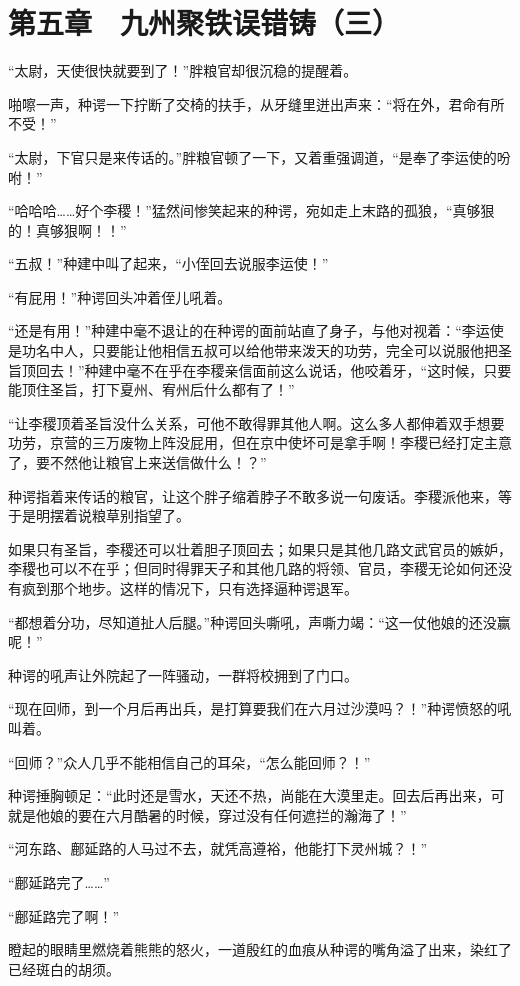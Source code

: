 \section{第五章　九州聚铁误错铸（三）}

“太尉，天使很快就要到了！”胖粮官却很沉稳的提醒着。

啪嚓一声，种谔一下拧断了交椅的扶手，从牙缝里迸出声来：“将在外，君命有所不受！”

“太尉，下官只是来传话的。”胖粮官顿了一下，又着重强调道，“是奉了李运使的吩咐！”

“哈哈哈……好个李稷！”猛然间惨笑起来的种谔，宛如走上末路的孤狼，“真够狠的！真够狠啊！！”

“五叔！”种建中叫了起来，“小侄回去说服李运使！”

“有屁用！”种谔回头冲着侄儿吼着。

“还是有用！”种建中毫不退让的在种谔的面前站直了身子，与他对视着：“李运使是功名中人，只要能让他相信五叔可以给他带来泼天的功劳，完全可以说服他把圣旨顶回去！”种建中毫不在乎在李稷亲信面前这么说话，他咬着牙，“这时候，只要能顶住圣旨，打下夏州、宥州后什么都有了！”

“让李稷顶着圣旨没什么关系，可他不敢得罪其他人啊。这么多人都伸着双手想要功劳，京营的三万废物上阵没屁用，但在京中使坏可是拿手啊！李稷已经打定主意了，要不然他让粮官上来送信做什么！？”

种谔指着来传话的粮官，让这个胖子缩着脖子不敢多说一句废话。李稷派他来，等于是明摆着说粮草别指望了。

如果只有圣旨，李稷还可以壮着胆子顶回去；如果只是其他几路文武官员的嫉妒，李稷也可以不在乎；但同时得罪天子和其他几路的将领、官员，李稷无论如何还没有疯到那个地步。这样的情况下，只有选择逼种谔退军。

“都想着分功，尽知道扯人后腿。”种谔回头嘶吼，声嘶力竭：“这一仗他娘的还没赢呢！”

种谔的吼声让外院起了一阵骚动，一群将校拥到了门口。

“现在回师，到一个月后再出兵，是打算要我们在六月过沙漠吗？！”种谔愤怒的吼叫着。

“回师？”众人几乎不能相信自己的耳朵，“怎么能回师？！”

种谔捶胸顿足：“此时还是雪水，天还不热，尚能在大漠里走。回去后再出来，可就是他娘的要在六月酷暑的时候，穿过没有任何遮拦的瀚海了！”

“河东路、鄜延路的人马过不去，就凭高遵裕，他能打下灵州城？！”

“鄜延路完了……”

“鄜延路完了啊！”

瞪起的眼睛里燃烧着熊熊的怒火，一道殷红的血痕从种谔的嘴角溢了出来，染红了已经斑白的胡须。

